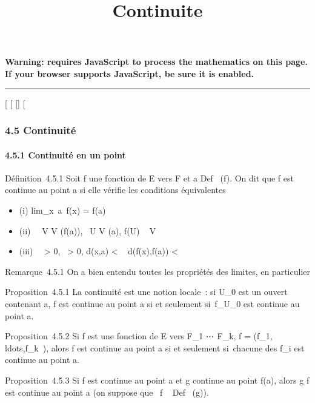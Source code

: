 \documentclass[]{article}
\title{Continuite}
\author{}
\date{}
\begin{document}
\maketitle

\textbf{Warning: 
requires JavaScript to process the mathematics on this page.\\ If your
browser supports JavaScript, be sure it is enabled.}

\begin{center}\rule{3in}{0.4pt}\end{center}

{[}
{[}
{[}{]}
{[}

\subsubsection{4.5 Continuité}

\paragraph{4.5.1 Continuité en un point}

Définition~4.5.1 Soit f une fonction de E vers F et a
\in Def~ (f). On dit que f est continue au point
a si elle vérifie les conditions équivalentes

\begin{itemize}
\itemsep1pt\parskip0pt
\item
  (i) lim_x\rightarrow~a~f(x) = f(a)
\item
  (ii) \forall~~V \in V (f(a)),
  \exists~U \in V (a), f(U) \subset~ V
\item
  (iii) \forall~~\epsilon \textgreater{} 0,
  \exists~\eta \textgreater{} 0, d(x,a) \textless{} \eta \rigtharrow~
  d(f(x),f(a)) \textless{} \epsilon
\end{itemize}

Remarque~4.5.1 On a bien entendu toutes les propriétés des limites, en
particulier

Proposition~4.5.1 La continuité est une notion locale~: si U_0
est un ouvert contenant a, f est continue au point a si et seulement
si~f_U_0 est continue au point a.

Proposition~4.5.2 Si f est une fonction de E vers F_1
\times⋯ \times F_k, f =
(f_1,\\ldots,f_k~),
alors f est continue au point a si et seulement si~chacune des
f_i est continue au point a.

Proposition~4.5.3 Si f est continue au point a et g continue au point
f(a), alors g \cdot f est continue au point a (on suppose que
\mathrmIm~f
\subset~ Def~ (g)).
\end{document}
